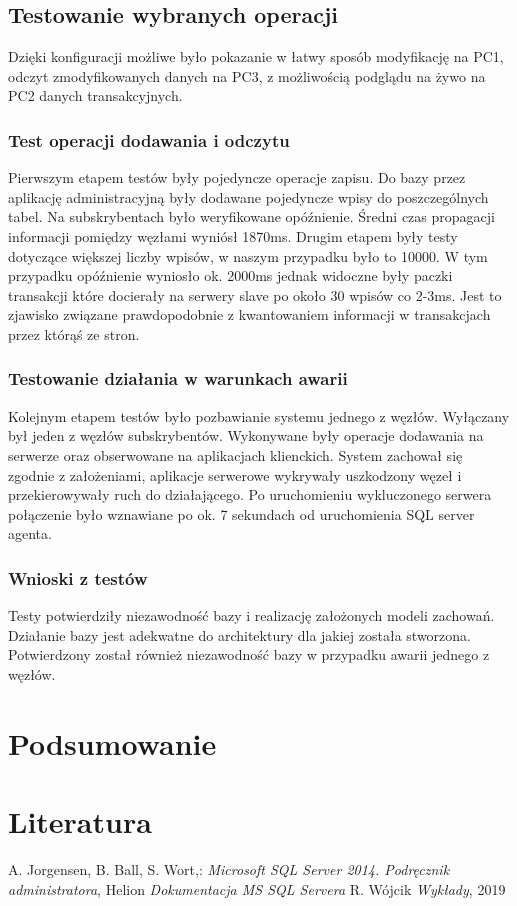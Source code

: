 \documentclass{article}
\begin{document}
\subsection{Testowanie wybranych operacji}	
Dzięki konfiguracji możliwe było pokazanie w łatwy sposób modyfikację na PC1, odczyt zmodyfikowanych danych na PC3, z możliwością podglądu na żywo na PC2 danych transakcyjnych.	

\subsubsection{Test operacji dodawania i odczytu}	

Pierwszym etapem testów były pojedyncze operacje zapisu. Do bazy przez aplikację administracyjną były dodawane pojedyncze wpisy do poszczególnych tabel. Na subskrybentach było weryfikowane opóźnienie. Średni czas propagacji informacji pomiędzy węzłami wyniósł 1870ms.
Drugim etapem były testy dotyczące większej liczby wpisów, w naszym przypadku było to 10000. W tym przypadku opóźnienie wyniosło ok. 2000ms jednak widoczne były paczki transakcji które docierały na serwery slave po około 30 wpisów co 2-3ms. Jest to zjawisko związane prawdopodobnie z kwantowaniem informacji w transakcjach przez którąś ze stron.

\subsubsection{Testowanie działania w warunkach awarii}
Kolejnym etapem testów było pozbawianie systemu jednego z węzłów. Wyłączany był jeden z węzłów subskrybentów. Wykonywane były operacje dodawania na serwerze oraz obserwowane na aplikacjach klienckich. System zachował się zgodnie z założeniami, aplikacje serwerowe wykrywały uszkodzony węzeł i przekierowywały ruch do działającego. Po uruchomieniu wykluczonego serwera połączenie było wznawiane po ok. 7 sekundach od uruchomienia SQL server agenta.

\subsubsection{Wnioski z testów}
Testy potwierdziły niezawodność bazy i realizację założonych modeli zachowań. Działanie bazy jest adekwatne do architektury dla jakiej została stworzona. Potwierdzony został również niezawodność bazy w przypadku awarii jednego z węzłów. 

\newpage
\section{Podsumowanie}

\section{Literatura}

\begin{thebibliography}{99}
 A. Jorgensen, B. Ball, S. Wort,:
\emph{Microsoft SQL Server 2014. Podręcznik administratora},
Helion
\emph{Dokumentacja MS SQL Servera}
 R. Wójcik
\emph{Wykłady},
2019
\end{thebibliography}

 
\end{document}
